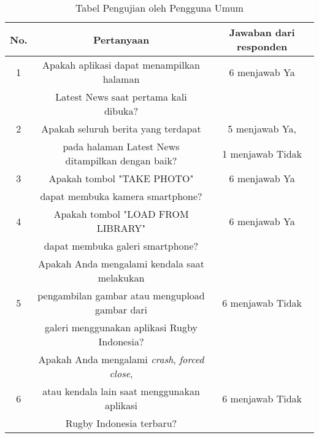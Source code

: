 \begin{table} [H]
    \centering
    \caption{Tabel Pengujian oleh Pengguna Umum}
    \begin{tabular}{|c|c|c|}
    \hline
       No. & Pertanyaan & Jawaban dari responden  \\ \hline
       1 & Apakah aplikasi dapat menampilkan halaman & 6 menjawab Ya \\ 
        & Latest News saat pertama kali dibuka? &  \\ \hline
    2 & Apakah seluruh berita yang terdapat & 5 menjawab Ya, \\
       &  pada halaman Latest News ditampilkan dengan baik? & 1 menjawab Tidak \\ \hline
       3 & Apakah tombol "TAKE PHOTO" & 6 menjawab Ya \\
     & dapat membuka kamera smartphone? & \\ \hline
     4 & Apakah tombol "LOAD FROM LIBRARY" & 6 menjawab Ya \\
     & dapat membuka galeri smartphone? & \\ \hline
     & Apakah Anda mengalami kendala saat melakukan & \\
      5 & pengambilan gambar atau mengupload gambar dari & 6 menjawab Tidak \\
     & galeri menggunakan aplikasi Rugby Indonesia? & \\ \hline
     & Apakah Anda mengalami \textit{crash}, \textit{forced close},  & \\
     6 & atau kendala lain saat menggunakan aplikasi & 6 menjawab Tidak \\
     & Rugby Indonesia terbaru? & \\ \hline
    \end{tabular}
    \label{tab:user-acceptance-test}
\end{table}